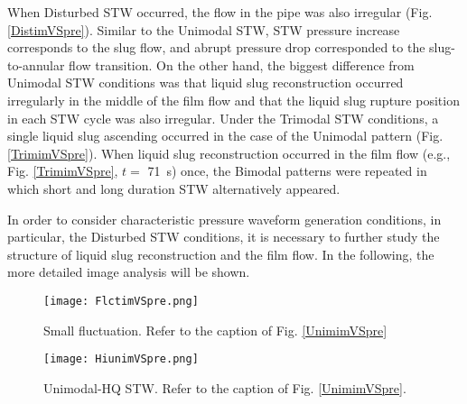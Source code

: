 \documentclass[aps,pre,preprint,groupedaddress,showkeys]{revtex4-2}
\begin{document}
When Disturbed STW occurred, the flow in the pipe was also irregular (Fig. \ref{DistimVSpre}).
Similar to the Unimodal STW, STW pressure increase corresponds to the slug flow, and abrupt pressure drop corresponded to the slug-to-annular flow transition. 
On the other hand, the biggest difference from Unimodal STW conditions was that liquid slug reconstruction occurred irregularly in the middle of the film flow and that the liquid slug rupture position in each STW cycle was also irregular.
Under the Trimodal STW conditions, a single liquid slug ascending occurred in the case of the Unimodal pattern (Fig. \ref{TrimimVSpre}).
When liquid slug reconstruction occurred in the film flow (e.g., Fig. \ref{TrimimVSpre}, $ t = $ \SI{71}{s}) once, the Bimodal patterns were repeated in which short and long duration STW alternatively appeared.

In order to consider characteristic pressure waveform generation conditions, in particular, the Disturbed STW conditions, it is necessary to further study the structure of liquid slug reconstruction and the film flow.
In the following, the more detailed image analysis will be shown.

\begin{figure}
\texttt{[image: FlctimVSpre.png]} 
\caption{\label{FlctimVSpre}Small fluctuation. Refer to the caption of Fig. \ref{UnimimVSpre}}
\end{figure} 

\begin{figure}
\texttt{[image: HiunimVSpre.png]} 
\caption{\label{HiunimVSpre}Unimodal-HQ STW. Refer to the caption of Fig. \ref{UnimimVSpre}.}
\end{figure} 
\end{document}
